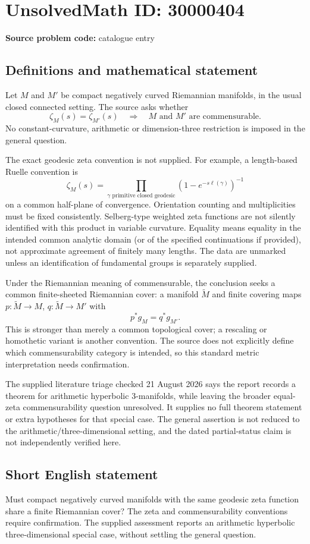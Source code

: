 \documentclass[11pt]{article}
\begin{document}
\section*{UnsolvedMath ID: 30000404}
\textbf{Source problem code:} catalogue entry
\subsection{Definitions and mathematical statement}
Let $M$ and $M'$ be compact negatively curved Riemannian manifolds, in the usual closed connected setting. The source asks whether
\[
 \zeta_M(s)=\zeta_{M'}(s)
 \quad\Longrightarrow\quad M\text{ and }M'\text{ are commensurable}.
\]
No constant-curvature, arithmetic or dimension-three restriction is imposed in the general question.

The exact geodesic zeta convention is not supplied. For example, a length-based Ruelle convention is
\[
 \zeta_M(s)=\prod_{\gamma\text{ primitive closed geodesic}}
                   (1-e^{-s\ell(\gamma)})^{-1}
\]
on a common half-plane of convergence. Orientation counting and multiplicities must be fixed consistently. Selberg-type weighted zeta functions are not silently identified with this product in variable curvature. Equality means equality in the intended common analytic domain (or of the specified continuations if provided), not approximate agreement of finitely many lengths. The data are unmarked unless an identification of fundamental groups is separately supplied.

Under the Riemannian meaning of commensurable, the conclusion seeks a common finite-sheeted Riemannian cover: a manifold $\widetilde M$ and finite covering maps $p:\widetilde M\to M$, $q:\widetilde M\to M'$ with
\[
 p^*g_M=q^*g_{M'}.
\]
This is stronger than merely a common topological cover; a rescaling or homothetic variant is another convention. The source does not explicitly define which commensurability category is intended, so this standard metric interpretation needs confirmation.

The supplied literature triage checked 21 August 2026 says the report records a theorem for arithmetic hyperbolic $3$-manifolds, while leaving the broader equal-zeta commensurability question unresolved. It supplies no full theorem statement or extra hypotheses for that special case. The general assertion is not reduced to the arithmetic/three-dimensional setting, and the dated partial-status claim is not independently verified here.
\subsection{Short English statement}
Must compact negatively curved manifolds with the same geodesic zeta function share a finite Riemannian cover? The zeta and commensurability conventions require confirmation. The supplied assessment reports an arithmetic hyperbolic three-dimensional special case, without settling the general question.
\end{document}
